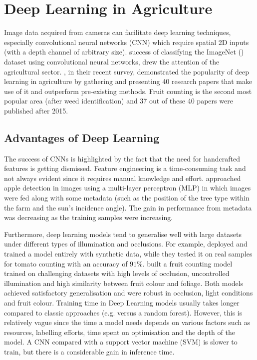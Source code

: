 \section{Deep Learning in Agriculture}
Image data acquired from cameras can facilitate deep learning techniques, especially convolutional neural networks (CNN) which require spatial 2D inputs (with a depth channel of arbitrary size). \cite{krizhevsky2012imagenet} success of classifying the ImageNet (\cite{deng2009imagenet}) dataset using convolutional neural networks, drew the attention of the agricultural sector. \cite{kamilaris2018deep}, in their recent survey, demonstrated the popularity of deep learning in agriculture by gathering and presenting 40 research papers that make use of it and outperform pre-existing methods. Fruit counting is the second most popular area (after weed identification) and 37 out of these 40 papers were published after 2015. 

\subsection{Advantages of Deep Learning}
The success of CNNs is highlighted by the fact that the need for handcrafted features is getting dismissed. Feature engineering is a time-consuming task and not always evident since it requires manual knowledge and effort. \cite{bargoti2016image} approached apple detection in images using a multi-layer perceptron (MLP) in which images were fed along with some metadata (such as the position of the tree type within the farm and the sun's incidence angle). The gain in performance from metadata was decreasing as the training samples were increasing. 

Furthermore, deep learning models tend to generalise well with large datasets under different types of illumination and occlusions. For example, \cite{rahnemoonfar2017deep} deployed and trained a model entirely with synthetic data, while they tested it on real samples for tomato counting with an accuracy of $91\%$. \cite{chen2017counting} built a fruit counting model trained on challenging datasets with high levels of occlusion, uncontrolled illumination and high similarity between fruit colour and foliage. Both models achieved satisfactory generalisation and were robust in occlusion, light conditions and fruit colour. Training time in Deep Learning models usually takes longer compared to classic approaches (e.g. versus a random forest). However, this is relatively vague since the time a model needs depends on various factors such as resources,  labelling efforts, time spent on optimisation and the depth of the model. A CNN compared with a support vector machine (SVM) is slower to train, but there is a considerable gain in inference time.

